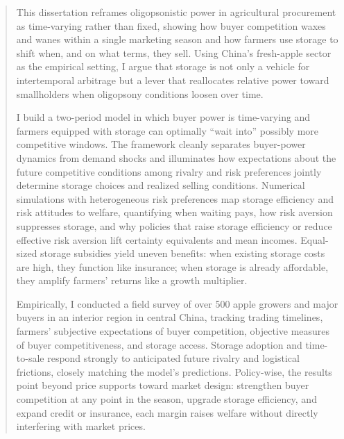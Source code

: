 \documentclass[12pt,authoryear, notitlepage]{elegantpaper}
\begin{document}
\newpage
\begin{abstract}
This dissertation reframes oligopsonistic power in agricultural procurement as time-varying rather than fixed, showing how buyer competition waxes and wanes within a single marketing season and how farmers use storage to shift when, and on what terms, they sell. Using China's fresh-apple sector as the empirical setting, I argue that storage is not only a vehicle for intertemporal arbitrage but a lever that reallocates relative power toward smallholders when oligopsony conditions loosen over time.

I build a two-period model in which buyer power is time-varying and farmers equipped with storage can optimally ``wait into'' possibly more competitive windows. The framework cleanly separates buyer-power dynamics from demand shocks and illuminates how expectations about the future competitive conditions among rivalry and risk preferences jointly determine storage choices and realized selling conditions. Numerical simulations with heterogeneous risk preferences map storage efficiency and risk attitudes to welfare, quantifying when waiting pays, how risk aversion suppresses storage, and why policies that raise storage efficiency or reduce effective risk aversion lift certainty equivalents and mean incomes. Equal-sized storage subsidies yield uneven benefits: when existing storage costs are high, they function like insurance; when storage is already affordable, they amplify farmers' returns like a growth multiplier.

Empirically, I conducted a field survey of over 500 apple growers and major buyers in an interior region in central China, tracking trading timelines, farmers' subjective expectations of buyer competition, objective measures of buyer competitiveness, and storage access. Storage adoption and time-to-sale respond strongly to anticipated future rivalry and logistical frictions, closely matching the model's predictions. Policy-wise, the results point beyond price supports toward market design: strengthen buyer competition at any point in the season, upgrade storage efficiency, and expand credit or insurance, each margin raises welfare without directly interfering with market prices.
\end{abstract}




\setcounter{tocdepth}{2}

\tableofcontents
{}
\listoffigures
{}
\listoftables
\end{document}
